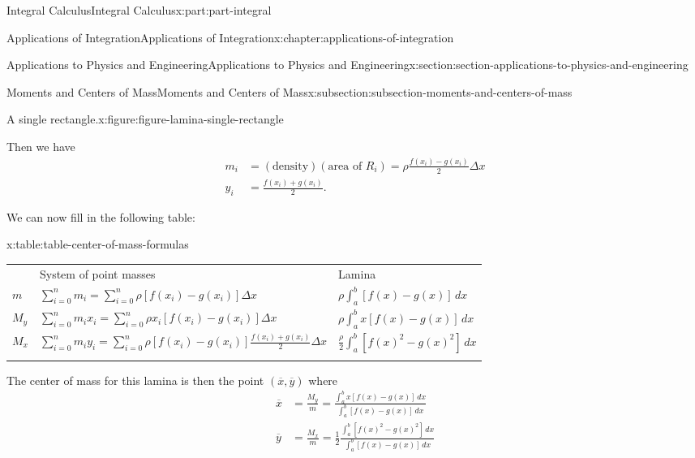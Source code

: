 \documentclass[twoside,10pt,]{book}
\newcommand{\tabularfont}{\relax}
\numberwithin{equation}{part}
\newcommand{\hrulethick} {\noalign{\hrule height 0.11em}}
\newcommand{\amp}{&}
\begin{document}
\begin{partptx}{Integral Calculus}{}{Integral Calculus}{}{}{x:part:part-integral}
\begin{chapterptx}{Applications of Integration}{}{Applications of Integration}{}{}{x:chapter:applications-of-integration}
\begin{sectionptx}{Applications to Physics and Engineering}{}{Applications to Physics and Engineering}{}{}{x:section:section-applications-to-physics-and-engineering}
\begin{subsectionptx}{Moments and Centers of Mass}{}{Moments and Centers of Mass}{}{}{x:subsection:subsection-moments-and-centers-of-mass}
\begin{figureptx}{A single rectangle.}{x:figure:figure-lamina-single-rectangle}{}
\begin{image}{0}{1}{0}
{
}%
\end{image}%
\tcblower
\end{figureptx}%
Then we have%
\begin{align*}
m_{i} \amp= (\text{density})(\text{area of }R_{i}) = \rho\frac{f(x_{i})-g(x_{i})}{2}\Delta x\\
y_{i} \amp= \frac{f(x_{i})+g(x_{i})}{2}.
\end{align*}
%
\par
We can now fill in the following table:%
\begin{tableptx}{\textbf{}}{x:table:table-center-of-mass-formulas}{}%
\centering%
{\tabularfont%
\begin{tabular}{lll}\hrulethick
&System of point masses&Lamina\tabularnewline\hrulethick
\(m\)&\(\sum_{i=0}^{n}m_{i} = \sum_{i=0}^{n}\rho[f(x_{i})-g(x_{i})]\Delta x\)&\(\rho\int_{a}^{b}[f(x)-g(x)]\,dx\)\tabularnewline[0pt]
\(M_{y}\)&\(\sum_{i=0}^{n}m_{i}x_{i} = \sum_{i=0}^{n}\rho x_{i}[f(x_{i})-g(x_{i})]\Delta x\)&\(\rho\int_{a}^{b}x[f(x)-g(x)]\,dx\)\tabularnewline[0pt]
\(M_{x}\)&\(\sum_{i=0}^{n}m_{i}y_{i} = \sum_{i=0}^{n}\rho[f(x_{i})-g(x_{i})]\frac{f(x_{i})+g(x_{i})}{2}\Delta x\)&\(\frac{\rho}{2}\int_{a}^{b}[f(x)^{2}-g(x)^{2}]\,dx\)\tabularnewline\hrulethick
\end{tabular}
}%
\end{tableptx}%
The center of mass for this lamina is then the point \((\overline{x},\overline{y})\) where%
\begin{align*}
\overline{x} \amp= \frac{M_{y}}{m} = \frac{\int_{a}^{b}x[f(x)-g(x)]\,dx}{\int_{a}^{b}[f(x)-g(x)]\,dx}\\
\overline{y} \amp= \frac{M_{x}}{m} = \frac{1}{2}\frac{\int_{a}^{b}[f(x)^{2}-g(x)^{2}]\,dx}{\int_{a}^{b}[f(x)-g(x)]\,dx}
\end{align*}
%
\end{subsectionptx}
\end{sectionptx}
%
%
\typeout{************************************************}

\end{chapterptx}
\end{partptx}
\end{document}
